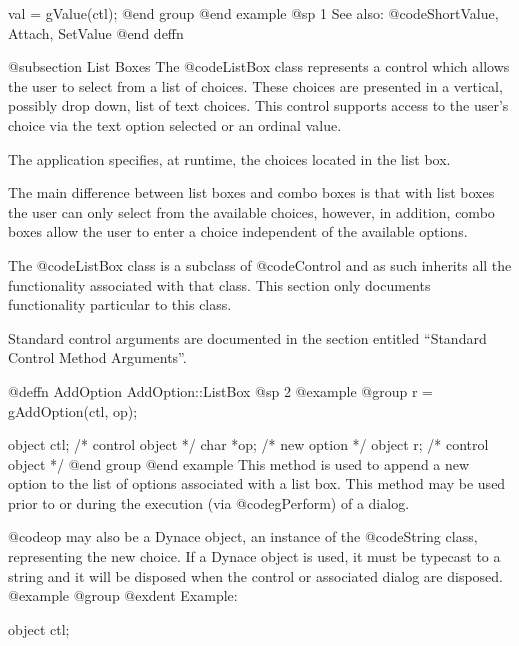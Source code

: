 {val = gValue(ctl);
@end group
@end example
@sp 1
See also:  @code{ShortValue, Attach, SetValue}
@end deffn











@subsection List Boxes
The @code{ListBox} class represents a control which allows the user
to select from a list of choices.  These choices are presented in
a vertical, possibly drop down, list of text choices.  This control
supports access to the user's choice via the text option selected or
an ordinal value.

The application specifies, at runtime, the choices located in the list box.

The main difference between list boxes and combo boxes is that with list
boxes the user can only select from the available choices, however, in
addition, combo boxes allow the user to enter a choice independent of
the available options.

The @code{ListBox} class is a subclass of @code{Control} and as such
inherits all the functionality associated with that class.  This section
only documents functionality particular to this class.

Standard control arguments are documented in the section entitled
``Standard Control Method Arguments''.













@deffn {AddOption} AddOption::ListBox
@sp 2
@example
@group
r = gAddOption(ctl, op);

object  ctl;    /*  control object  */
char    *op;    /*  new option      */
object  r;      /*  control object  */
@end group
@end example
This method is used to append a new option to the list of options associated
with a list box.  This method may be used prior to or during the execution
(via @code{gPerform}) of a dialog.

@code{op} may also be a Dynace object, an instance of the @code{String}
class, representing the new choice.  If a Dynace object is used, it must
be typecast to a string and it will be disposed when the control or
associated dialog are disposed.
@example
@group
@exdent Example:

object  ctl;

}
